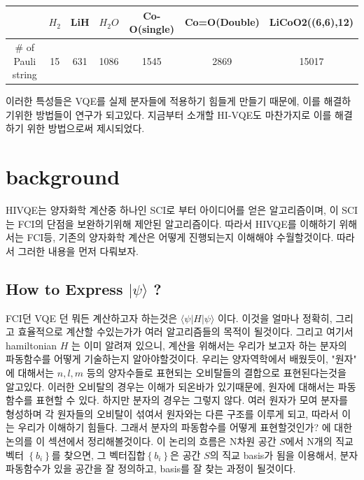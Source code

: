 \documentclass[11pt]{article}
\begin{document}
\begin{enumerate}[label=3)]
% 
\begin{center}
\begin{tabular}{@{}ccccccc@{}}
\toprule
                   & \(H_2\) & LiH & \(H_2O\) & Co-O(single) & Co=O(Double) & LiCoO2((6,6),12)          \\ \midrule
\# of Pauli string & 15   & 631 & 1086  & 1545         & 2869         & \multicolumn{1}{c}{15017} \\ \bottomrule
\end{tabular}
\end{center}

이러한 특성들은 VQE를 실제 분자들에 적용하기 힘들게 만들기 때문에, 이를 해결하기위한 방법들이 연구가 되고있다. 지금부터 소개할 HI-VQE도 마찬가지로 이를 해결하기 위한 방법으로써 제시되었다.
\end{enumerate}
\newpage

\section{background}
HIVQE는 양자화학 계산중 하나인 SCI로 부터 아이디어를 얻은 알고리즘이며, 이 SCI는 FCI의 단점을 보완하기위해 제안된 알고리즘이다. 
따라서 HIVQE를 이해하기 위해서는 FCI등, 기존의 양자화학 계산은 어떻게 진행되는지 이해해야 수월할것이다. 따라서 그러한 내용을 먼저 다뤄보자. 

\subsection{How to Express \(|\psi \rangle\) ?}
FCI던 VQE 던 뭐든 계산하고자 하는것은 \(\langle \psi|H|\psi \rangle\) 이다. 이것을 얼마나 정확히,
그리고 효율적으로 계산할 수있는가가 여러 알고리즘들의 목적이 될것이다. 그리고 여기서 hamiltonian \(H\) 는 이미 알려져 있으니, 계산을 위해서는 우리가 보고자 하는 분자의 파동함수를 어떻게 기술하는지 알아야할것이다.
우리는 양자역학에서 배웠듯이, "원자" 에 대해서는 \(n,l,m\) 등의 양자수들로 표현되는 오비탈들의 결합으로 표현된다는것을 알고있다.
이러한 오비탈의 경우는 이해가 되온바가 있기때문에, 원자에 대해서는 파동함수를 표현할 수 있다. 하지만 분자의 경우는 그렇지 않다. 
여러 원자가 모여 분자를 형성하며 각 원자들의 오비탈이 섞여서 원자와는 다른 구조를 이루게 되고, 따라서 이는 우리가 이해하기 힘들다. 
그래서 분자의 파동함수를 어떻게 표현할것인가? 에 대한 논의를 이 섹션에서 정리해볼것이다.
이 논리의 흐름은 N차원 공간 \(S\)에서 N개의 직교벡터 \(\left\{b_i\right\}\)를 찾으면, 그 벡터집합\(\left\{b_i\right\}\)은 공간 \(S\)의 직교 basis가 됨을 이용해서, 
분자 파동함수가 있을 공간을 잘 정의하고, basis를 잘 찾는 과정이 될것이다. 
\end{document}
